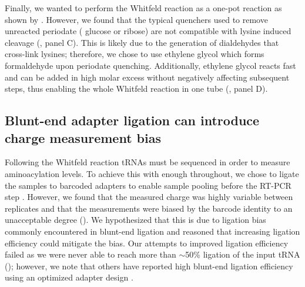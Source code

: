 \documentclass[9pt,lineno]{elife}
\begin{document}
Finally, we wanted to perform the Whitfeld reaction as a one-pot reaction as shown by \cite{Watkins2022-er}.
However, we found that the typical quenchers used to remove unreacted periodate ( glucose or ribose) are not compatible with lysine induced cleavage (, panel C).
This is likely due to the generation of dialdehydes that cross-link lysines; therefore, we chose to use ethylene glycol which forms formaldehyde upon periodate quenching.
Additionally, ethylene glycol reacts fast and can be added in high molar excess without negatively affecting subsequent steps, thus enabling the whole Whitfeld reaction in one tube (, panel D).



\subsection{Blunt-end adapter ligation can introduce charge measurement bias}
Following the Whitfeld reaction tRNAs must be sequenced in order to measure aminoacylation levels.
To achieve this with enough throughout, we chose to ligate the samples to barcoded adapters to enable sample pooling before the RT-PCR step \citep{McGlincy2017-ro}.
However, we found that the measured charge was highly variable between replicates and that the measurements were biased by the barcode identity to an unacceptable degree ().
We hypothesized that this is due to ligation bias commonly encountered in blunt-end ligation \citep{Fuchs2015-nb, Zhuang2012-nu, Jayaprakash2011-ab} and reasoned that increasing ligation efficiency could mitigate the bias.
Our attempts to improved ligation efficiency failed as we were never able to reach more than $\sim$50\% ligation of the input tRNA (); however, we note that others have reported high blunt-end ligation efficiency using an optimized adapter design \citep{Behrens2021-gb}.
\end{document}
